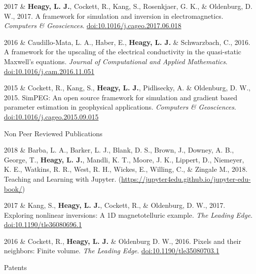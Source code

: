 \documentclass[a4paper, 11pt]{article}
\newcommand{\doi}[1]{\href{https://doi.org/#1}{doi:#1}}
\newcommand{\subheading}[1]{
    \vspace{0.3cm}
    {%
    \Large
    #1}\\
    \vspace{0.0cm}
}
\begin{document}
\begin{entryright}
2017 & \textbf{Heagy, L. J.}, Cockett, R., Kang, S., Rosenkjaer, G. K., \& Oldenburg, D. W., 2017. A framework for simulation and inversion in electromagnetics. \emph{Computers \& Geosciences}. \doi{10.1016/j.cageo.2017.06.018}
\end{entryright}

\begin{entryright}
2016 & Caudillo-Mata, L. A., Haber, E., \textbf{Heagy, L. J.} \& Schwarzbach, C., 2016. A framework for the upscaling of the electrical conductivity in the quasi-static Maxwell’s equations. \emph{Journal of Computational and Applied Mathematics}. \doi{10.1016/j.cam.2016.11.051}
\end{entryright}

\begin{entryright}
2015 & Cockett, R., Kang, S., \textbf{Heagy, L. J.}, Pidlisecky, A. \& Oldenburg, D. W., 2015. SimPEG: An open source framework for simulation and gradient based parameter estimation in geophysical applications. \emph{Computers \& Geosciences}. \doi{10.1016/j.cageo.2015.09.015}
\end{entryright}


\subheading{Non Peer Reviewed Publications}

\begin{entryright}
2018 & Barba, L. A., Barker, L. J., Blank, D. S., Brown, J., Downey, A. B., George, T., \textbf{Heagy, L. J.},  Mandli, K. T., Moore, J. K., Lippert, D.,  Niemeyer, K. E., Watkins, R. R., West, R. H., Wickes, E., Willing, C., \& Zingale M., 2018. Teaching and Learning with Jupyter. (\href{https://jupyter4edu.github.io/jupyter-edu-book/}{https://jupyter4edu.github.io/jupyter-edu-book/})
\end{entryright}

\begin{entryright}
2017 & Kang, S., \textbf{Heagy, L. J.}, Cockett, R.,  \& Oldenburg, D. W., 2017. Exploring nonlinear inversions: A 1D magnetotelluric example. \emph{The Leading Edge}. \doi{10.1190/tle36080696.1}
\end{entryright}

\begin{entryright}
2016 & Cockett, R., \textbf{Heagy, L. J.} \& Oldenburg D. W., 2016. Pixels and their neighbors: Finite volume. \emph{The Leading Edge}. \doi{10.1190/tle35080703.1}
\end{entryright}

\subheading{Patents}
\end{document}

